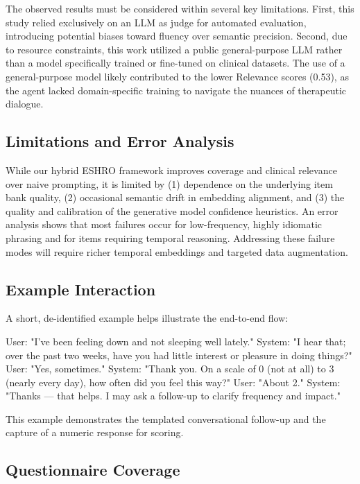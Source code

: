 \documentclass[sigconf]{acmart}
\begin{document}
The observed results must be considered within several key limitations. First, this study relied exclusively on an LLM as judge for automated evaluation, introducing potential biases toward fluency over semantic precision. Second, due to resource constraints, this work utilized a public general-purpose LLM rather than a model specifically trained or fine-tuned on clinical datasets. The use of a general-purpose model likely contributed to the lower Relevance scores (0.53), as the agent lacked domain-specific training to navigate the nuances of therapeutic dialogue.

\subsection{Limitations and Error Analysis}

While our hybrid ESHRO framework improves coverage and clinical relevance over naive prompting, it is limited by (1) dependence on the underlying item bank quality, (2) occasional semantic drift in embedding alignment, and (3) the quality and calibration of the generative model confidence heuristics. An error analysis shows that most failures occur for low-frequency, highly idiomatic phrasing and for items requiring temporal reasoning. Addressing these failure modes will require richer temporal embeddings and targeted data augmentation.

\subsection{Example Interaction}

A short, de-identified example helps illustrate the end-to-end flow:
\begin{framed}
User: "I've been feeling down and not sleeping well lately."
System: "I hear that; over the past two weeks, have you had little interest or pleasure in doing things?"
User: "Yes, sometimes."
System: "Thank you. On a scale of 0 (not at all) to 3 (nearly every day), how often did you feel this way?"
User: "About 2."
System: "Thanks — that helps. I may ask a follow-up to clarify frequency and impact."
\end{framed}

This example demonstrates the templated conversational follow-up and the capture of a numeric response for scoring.

\subsection{Questionnaire Coverage}
\end{document}
